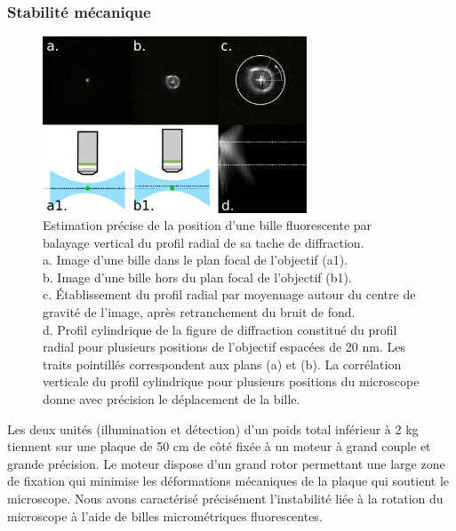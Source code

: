 
\subsubsection{Stabilité mécanique}

\begin{figure}[b!]
    \centering
    \includegraphics[width=0.7\textwidth]{./files/bead_position.svg.png}
    \caption{Estimation précise de la position d'une bille fluorescente par balayage vertical du profil radial de sa tache de diffraction.
    \\ a. Image d'une bille dans le plan focal de l'objectif (a1).
    \\ b. Image d'une bille hors du plan focal de l'objectif (b1).
    \\ c. Établissement du profil radial par moyennage autour du centre de gravité de l'image, après retranchement du bruit de fond.
    \\ d. Profil cylindrique de la figure de diffraction constitué du profil radial pour plusieurs positions de l'objectif espacées de 20 nm. Les traits pointillés correspondent aux plans (a) et (b). La corrélation verticale du profil cylindrique pour plusieurs positions du microscope donne avec précision le déplacement de la bille.
    \label{FIGbeadstability}}
    \end{figure}

Les deux unités (illumination et détection) d'un poids total inférieur à 2 kg tiennent sur une plaque de 50 cm de côté fixée à un moteur à grand couple et grande précision. Le moteur dispose d'un grand rotor permettant une large zone de fixation qui minimise les déformations mécaniques de la plaque qui soutient le microscope. Nous avons caractérisé précisément l'instabilité liée à la rotation du microscope à l'aide de billes micrométriques fluorescentes.

